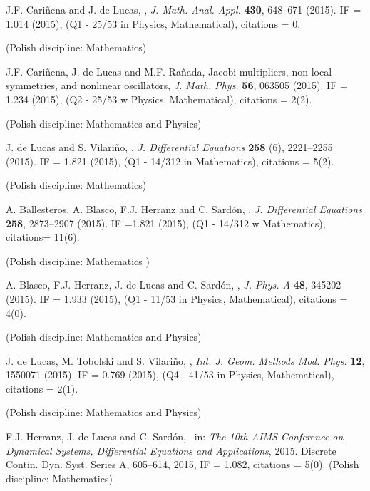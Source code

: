 \documentclass[12pt,reqno]{amsbook}
\begin{document}
\begin{enumerate}
{ \item J.F. Cari\~nena and J. de Lucas, \color{blue}{ Quasi--Lie families, schemes, invariants and their applications to Abel equations}\color{black}, {\it J. Math. Anal. Appl.} {\bf 430}, 648--671 (2015). IF = 1.014 (2015), (Q1 - 25/53 in Physics, Mathematical), citations = 0. } (Polish discipline: Mathematics)

{ \item J.F. Cari\~nena, J. de Lucas and M.F. Ra\~nada, \color{blue} Jacobi multipliers, non-local symmetries, and nonlinear oscillators\color{black}, {\it J. Math. Phys.} {\bf 56},  063505 (2015). IF = 1.234 (2015), (Q2 - 25/53 w Physics, Mathematical), citations = 2(2).} (Polish discipline: Mathematics and Physics)


{ \item J. de Lucas  and S. Vilariño, \color{blue}{$k$-symplectic Lie systems: theory and applications}\color{black}, {\it J. Differential Equations} {\bf 258} (6), 2221--2255 (2015). IF = 1.821 (2015), (Q1 - 14/312 in Mathematics), citations = 5(2).} (Polish discipline: Mathematics)

{ \item A. Ballesteros, A. Blasco, F.J. Herranz and C. Sard\'on,  \color{blue}{Lie--Hamilton systems on the plane: Properties, classification and applications}\color{black}, {\it J. Differential Equations} {\bf 258}, 2873--2907 (2015). IF =1.821 (2015), (Q1 - 14/312 w Mathematics), citations= 11(6).} (Polish discipline: Mathematics )

{ \item A. Blasco, F.J. Herranz, J. de Lucas and C. Sard\'on, \color{blue}{ Lie--Hamilton systems on the plane: applications and superposition rules}\color{black}, {\it J. Phys. A} {\bf 48}, 345202 (2015). IF = 1.933 (2015), (Q1 - 11/53 in Physics, Mathematical),  citations = 4(0).} (Polish discipline: Mathematics and Physics)


{ \item J. de Lucas, M. Tobolski and S. Vilariño, \color{blue}{A new application of $k$-symplectic Lie systems}\color{black}, {\it  Int. J. Geom. Methods Mod. Phys.} {\bf 12}, 1550071 (2015). IF = 0.769 (2015), (Q4 - 41/53 in Physics, Mathematical), citations = 2(1).  } (Polish discipline: Mathematics and Physics)

{ \item F.J. Herranz, J. de Lucas and C. Sard\'on, \color{blue}{Jacobi--Lie systems: theory and low dimensional classification}\color {black}\, in: {\sl The 10th AIMS Conference on Dynamical Systems, Differential Equations and Applications}, 2015. Discrete Contin. Dyn. Syst. Series A, 605--614, 2015,  IF = 1.082, citations = 5(0). (Polish discipline: Mathematics) }


\end{enumerate}
\end{document}
